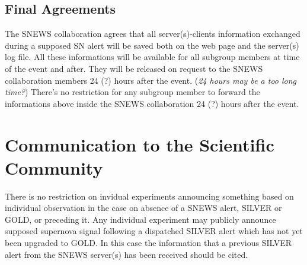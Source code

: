 \documentclass{article}
\begin{document}
\subsection{Final Agreements}

The SNEWS collaboration agrees that all server(s)-clients information
exchanged during a supposed SN alert will be saved both on the web page
and the server(s) log file. All these informations will be available
for all subgroup members at time of the event and after. They will be
released on request to the SNEWS collaboration members 24 (?) hours
after the event.  ({\it 24 hours may be a too long time?})  There's no
restriction for any subgroup member to forward the informations above
inside the SNEWS collaboration 24 (?) hours after the event.


\section{Communication to the Scientific Community}
There is no restriction on invidual experiments announcing something
based on individual observation in the case on absence of a SNEWS
alert, SILVER or GOLD, or preceding it.  Any individual experiment may
publicly announce supposed supernova signal following a dispatched 
SILVER alert which has not yet been upgraded to GOLD.  In this case 
the information that a previous SILVER alert from the
SNEWS server(s) has been received should be cited.
                                         
\end{document}
